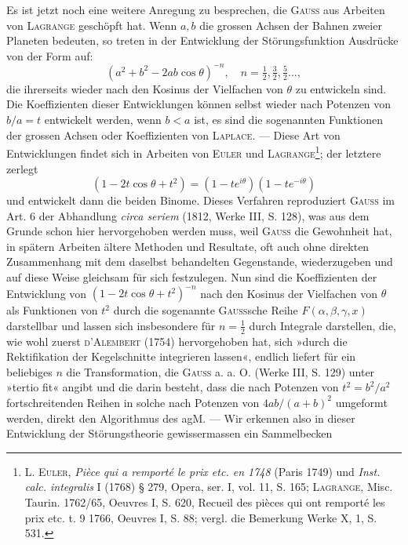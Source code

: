 Es ist jetzt noch eine weitere Anregung zu besprechen, die \textsc{Gauss} aus
Arbeiten von \textsc{Lagrange} geschöpft hat. Wenn \(a,b\) die grossen Achsen der
Bahnen zweier Planeten bedeuten, so treten in der Entwicklung der Störungsfunktion
Ausdrücke von der Form auf:
\[
(a^2+b^2-2ab\cos\theta)^{-n},\quad n=\tfrac12,\tfrac32,\tfrac52\ldots,
\]
\clearpage{}
\noindent die ihrerseits wieder nach den Kosinus der Vielfachen von \(\theta\) zu entwickeln
sind. Die Koeffizienten dieser Entwicklungen können selbst wieder nach Potenzen
von \(b/a=t\) entwickelt werden, wenn \(b<a\) ist, es sind die sogenannten
Funktionen der grossen Achsen oder Koeffizienten von \textsc{Laplace}. — Diese
Art von Entwicklungen findet sich in Arbeiten von \textsc{Euler} und \textsc{Lagrange}\footnote{L. \textsc{Euler}, \textit{Pièce qui a remporté le prix etc. en 1748} (Paris 1749) und \textit{Inst. calc. integralis} I (1768) § 279, Opera, ser. I, vol. 11, S. 165; \textsc{Lagrange}, Misc. Taurin. 1762/65, Oeuvres I, S. 620, Recueil des pièces qui ont remporté les prix etc. t. 9 1766, Oeuvres I, S. 88; vergl. die Bemerkung Werke X, 1, S. 531.};
der letztere zerlegt
\[
(1-2t\cos\theta+t^2)=(1-te^{i\theta})(1-te^{-i\theta})
\]
und entwickelt dann die beiden Binome. Dieses Verfahren reproduziert \textsc{Gauss}
im Art. 6 der Abhandlung \textit{circa seriem} (1812, Werke III, S. 128), was aus
dem Grunde schon hier hervorgehoben werden muss, weil \textsc{Gauss} die Gewohnheit
hat, in spätern Arbeiten ältere Methoden und Resultate, oft auch ohne
direkten Zusammenhang mit dem daselbst behandelten Gegenstande, wiederzugeben
und auf diese Weise gleichsam für sich festzulegen. Nun sind die
Koeffizienten der Entwicklung von \((1-2t\cos\theta+t^2)^{-n}\) nach den Kosinus der
Vielfachen von \(\theta\) als Funktionen von \(t^2\) durch die sogenannte \textsc{Gauss}sche Reihe
\(F(\alpha,\beta,\gamma,x)\) darstellbar und lassen sich insbesondere für \(n=\frac12\) durch Integrale
darstellen, die, wie wohl zuerst \textsc{d’Alembert} (1754) hervorgehoben hat, sich
»durch die Rektifikation der Kegelschnitte integrieren lassen«, endlich liefert
für ein beliebiges \(n\) die Transformation, die \textsc{Gauss} a. a. O. (Werke III, S. 129)
unter »tertio fit« angibt und die darin besteht, dass die nach Potenzen von
\(t^2=b^2/a^2\) fortschreitenden Reihen in solche nach Potenzen von \(4ab/(a+b)^2\)
umgeformt werden, direkt den Algorithmus des agM. — Wir erkennen also
in dieser Entwicklung der Störungstheorie gewissermassen ein Sammelbecken
